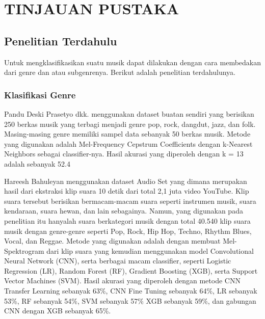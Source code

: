 \chapter{TINJAUAN PUSTAKA}
\label{chap:tinjauanpustaka}


\section{Penelitian Terdahulu}
\label{sec:penelitianterdahulu}

Untuk mengklasifikasikan suatu musik dapat dilakukan dengan cara membedakan dari genre dan atau subgenrenya. Berikut adalah penelitian terdahulunya.

\subsection{Klasifikasi Genre}

Pandu Deski Prasetyo dkk. \citep{prasetyo} menggunakan dataset buatan sendiri yang berisikan 250 berkas musik yang terbagi menjadi genre pop, rock, dangdut, jazz, dan folk. Masing-masing genre memiliki sampel data sebanyak 50 berkas musik. Metode yang digunakan adalah Mel-Frequency Cepstrum Coefficients dengan k-Nearest Neighbors sebagai classifier-nya. Hasil akurasi yang diperoleh dengan k = 13 adalah sebanyak 52.4%

Hareesh Bahuleyan \citep{DBLP:journals/corr/abs-1804-01149} menggunakan dataset Audio Set yang dimana merupakan hasil dari ekstraksi klip suara 10 detik dari total 2,1 juta video YouTube. Klip suara tersebut berisikan bermacam-macam suara seperti instrumen musik, suara kendaraan, suara hewan, dan lain sebagainya. Namun, yang digunakan pada penelitian itu hanyalah suara berkategori musik dengan total 40.540 klip suara musik dengan genre-genre seperti Pop, Rock, Hip Hop, Techno, Rhythm Blues, Vocal, dan Reggae. Metode yang digunakan adalah dengan membuat Mel-Spektrogram dari klip suara yang kemudian menggunakan model Convolutional Neural Network (CNN), serta berbagai macam classifier, seperti Logistic Regression (LR), Random Forest (RF), Gradient Boosting (XGB), serta Support Vector Machines (SVM). Hasil akurasi yang diperoleh dengan metode CNN Transfer Learning sebanyak 63\%, CNN Fine Tuning sebanyak 64\%, LR sebanyak 53\%, RF sebanyak 54\%, SVM sebanyak 57\% XGB sebanyak 59\%, dan gabungan CNN dengan XGB sebanyak 65\%.

